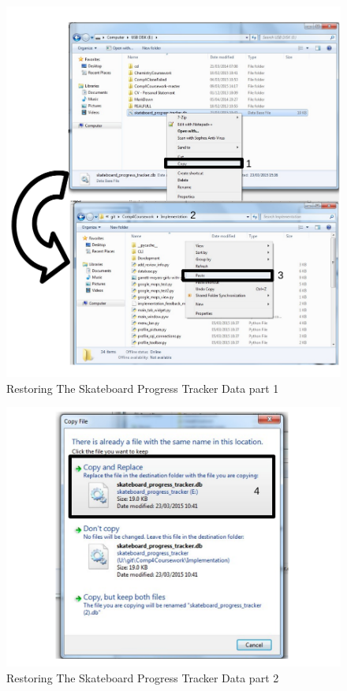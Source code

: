 \begin{figure}[H]
    \includegraphics[width=\textwidth]{./Manual/Images/RestoringData.pdf}
    \caption{Restoring The Skateboard Progress Tracker Data part 1} \label{fig:Restoring Data}
\end{figure}
\begin{figure}[H]
    \includegraphics[width=\textwidth]{./Manual/Images/RestoringData2.pdf}
    \caption{Restoring The Skateboard Progress Tracker Data part 2} \label{fig:Restoring Data2}
\end{figure}

